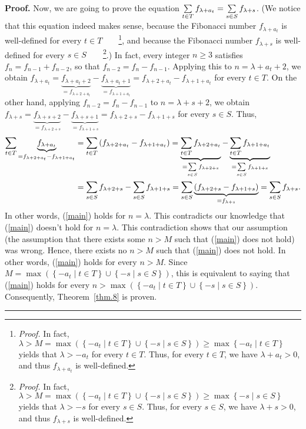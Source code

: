 \documentclass[numbers=enddot,12pt,final,onecolumn,notitlepage]{scrartcl}%
\numberwithin{exer}{section}
\theoremstyle{definition}
\newenvironment{proof}[1][Proof]{\noindent\textbf{#1.} }{\ \rule{0.5em}{0.5em}}
\let\sumnonlimits\sum
\renewcommand{\sum}{\sumnonlimits\limits}
\begin{document}
\begin{proof}
Now, we are going to prove the equation $\sum\limits_{t\in T}f_{\lambda+a_{t}%
}=\sum\limits_{s\in S}f_{\lambda+s}$. (We notice that this equation indeed
makes sense, because the Fibonacci number $f_{\lambda+a_{t}}$ is well-defined
for every $t\in T$\ \ \ \ \footnote{\textit{Proof.} In fact, $\lambda
>M=\max\left(  \left\{  -a_{t}\mid t\in T\right\}  \cup\left\{  -s\mid s\in
S\right\}  \right)  \geq\max\left\{  -a_{t}\mid t\in T\right\}  $ yields that
$\lambda>-a_{t}$ for every $t\in T$. Thus, for every $t\in T$, we have
$\lambda+a_{t}>0$, and thus $f_{\lambda+a_{t}}$ is well-defined.}, and because
the Fibonacci number $f_{\lambda+s}$ is well-defined for every $s\in
S$\ \ \ \ \footnote{\textit{Proof.} In fact, $\lambda>M=\max\left(  \left\{
-a_{t}\mid t\in T\right\}  \cup\left\{  -s\mid s\in S\right\}  \right)
\geq\max\left\{  -s\mid s\in S\right\}  $ yields that $\lambda>-s$ for every
$s\in S$. Thus, for every $s\in S$, we have $\lambda+s>0$, and thus
$f_{\lambda+s}$ is well-defined.}.) In fact, every integer $n\geq3$ satisfies
$f_{n}=f_{n-1}+f_{n-2}$, so that $f_{n-2}=f_{n}-f_{n-1}$. Applying this to
$n=\lambda+a_{t}+2$, we obtain $f_{\lambda+a_{t}}=\underbrace{f_{\lambda
+a_{t}+2}}_{=f_{\lambda+2+a_{t}}}-\underbrace{f_{\lambda+a_{t}+1}%
}_{=f_{\lambda+1+a_{t}}}=f_{\lambda+2+a_{t}}-f_{\lambda+1+a_{t}}$ for every
$t\in T$. On the other hand, applying $f_{n-2}=f_{n}-f_{n-1}$ to
$n=\lambda+s+2$, we obtain $f_{\lambda+s}=\underbrace{f_{\lambda+s+2}%
}_{=f_{\lambda+2+s}}-\underbrace{f_{\lambda+s+1}}_{=f_{\lambda+1+s}%
}=f_{\lambda+2+s}-f_{\lambda+1+s}$ for every $s\in S$. Thus,%
\begin{align*}
\sum\limits_{t\in T}\underbrace{f_{\lambda+a_{t}}}_{=f_{\lambda+2+a_{t}%
}-f_{\lambda+1+a_{t}}}  &  =\sum\limits_{t\in T}\left(  f_{\lambda+2+a_{t}%
}-f_{\lambda+1+a_{t}}\right)  =\underbrace{\sum\limits_{t\in T}f_{\lambda
+2+a_{t}}}_{=\sum\limits_{s\in S}f_{\lambda+2+s}}-\underbrace{\sum
\limits_{t\in T}f_{\lambda+1+a_{t}}}_{=\sum\limits_{s\in S}f_{\lambda+1+s}}\\
&  =\sum\limits_{s\in S}f_{\lambda+2+s}-\sum\limits_{s\in S}f_{\lambda
+1+s}=\sum\limits_{s\in S}\underbrace{\left(  f_{\lambda+2+s}-f_{\lambda
+1+s}\right)  }_{=f_{\lambda+s}}=\sum\limits_{s\in S}f_{\lambda+s}.
\end{align*}
In other words, (\ref{main}) holds for $n=\lambda$. This contradicts our
knowledge that (\ref{main}) doesn't hold for $n=\lambda$. This contradiction
shows that our assumption (the assumption that there exists some $n>M$ such
that (\ref{main}) does not hold) was wrong. Hence, there exists no $n>M$ such
that (\ref{main}) does not hold. In other words, (\ref{main}) holds for every
$n>M$. Since $M=\max\left(  \left\{  -a_{t}\mid t\in T\right\}  \cup\left\{
-s\mid s\in S\right\}  \right)  $, this is equivalent to saying that
(\ref{main}) holds for every $n>\max\left(  \left\{  -a_{t}\mid t\in
T\right\}  \cup\left\{  -s\mid s\in S\right\}  \right)  $. Consequently,
Theorem~\ref{thm.8} is proven.
\end{proof}
\end{document}
